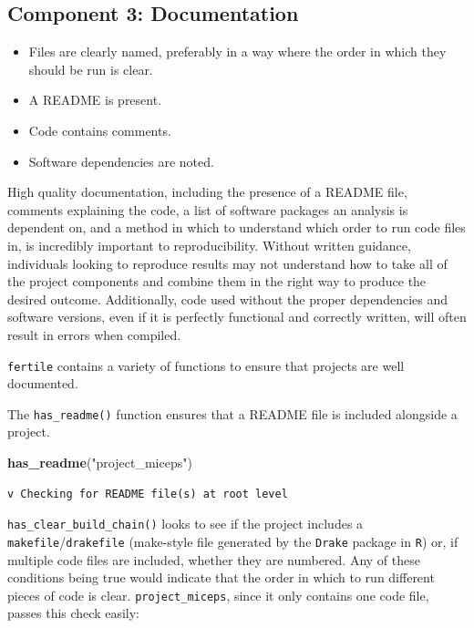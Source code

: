 \documentclass[12pt,twoside]{reedthesis}
\newenvironment{Shaded}{\begin{snugshade}}{\end{snugshade}}
\newcommand{\KeywordTok}[1]{\textcolor[rgb]{0.13,0.29,0.53}{\textbf{#1}}}
\newcommand{\StringTok}[1]{\textcolor[rgb]{0.31,0.60,0.02}{#1}}
\newcommand{\NormalTok}[1]{#1}
\providecommand{\tightlist}{%
  \setlength{\itemsep}{0pt}\setlength{\parskip}{0pt}}
\begin{document}
\subsection{Component 3: Documentation}\label{component-3-documentation}
\begin{itemize}
\tightlist
\item
  Files are clearly named, preferably in a way where the order in which
  they should be run is clear.
\item
  A README is present.
\item
  Code contains comments.
\item
  Software dependencies are noted.
\end{itemize}
High quality documentation, including the presence of a README file,
comments explaining the code, a list of software packages an analysis is
dependent on, and a method in which to understand which order to run
code files in, is incredibly important to reproducibility. Without
written guidance, individuals looking to reproduce results may not
understand how to take all of the project components and combine them in
the right way to produce the desired outcome. Additionally, code used
without the proper dependencies and software versions, even if it is
perfectly functional and correctly written, will often result in errors
when compiled.

\texttt{fertile} contains a variety of functions to ensure that projects
are well documented.

The \texttt{has\_readme()} function ensures that a README file is
included alongside a project.

\footnotesize
\begin{Shaded}
\begin{Highlighting}[]
\KeywordTok{has_readme}\NormalTok{(}\StringTok{"project_miceps"}\NormalTok{)}
\end{Highlighting}
\end{Shaded}
\begin{verbatim}
v Checking for README file(s) at root level
\end{verbatim}
\normalsize

\texttt{has\_clear\_build\_chain()} looks to see if the project includes
a \texttt{makefile}/\texttt{drakefile} (make-style file generated by the
\texttt{Drake} package in \texttt{R}) or, if multiple code files are
included, whether they are numbered. Any of these conditions being true
would indicate that the order in which to run different pieces of code
is clear. \texttt{project\_miceps}, since it only contains one code
file, passes this check easily:
\end{document}
